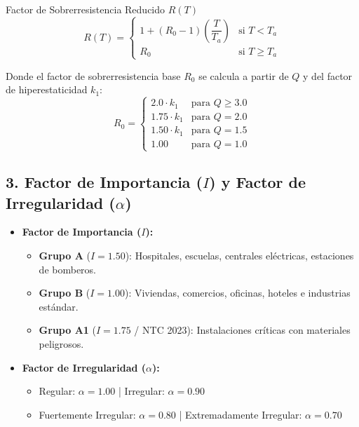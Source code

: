 \documentclass[11pt,a4paper]{article}
\begin{document}
\begin{formulabox}{Factor de Sobrerresistencia Reducido $R(T)$}
$$
R(T) = 
\begin{cases} 
1 + (R_0 - 1) \left(\dfrac{T}{T_a}\right) & \text{si } T < T_a \\[8pt]
R_0 & \text{si } T \ge T_a
\end{cases}
$$
\end{formulabox}

Donde el factor de sobrerresistencia base $R_0$ se calcula a partir de $Q$ y del factor de hiperestaticidad $k_1$:
\begin{equation}
R_0 = 
\begin{cases}
2.0 \cdot k_1 & \text{para } Q \ge 3.0 \\
1.75 \cdot k_1 & \text{para } Q = 2.0 \\
1.50 \cdot k_1 & \text{para } Q = 1.5 \\
1.00 & \text{para } Q = 1.0
\end{cases}
\end{equation}

\subsection{3. Factor de Importancia ($I$) y Factor de Irregularidad ($\alpha$)}
\begin{itemize}[noitemsep]
    \item \textbf{Factor de Importancia ($I$):}
    \begin{itemize}[noitemsep]
        \item \textbf{Grupo A} ($I = 1.50$): Hospitales, escuelas, centrales eléctricas, estaciones de bomberos.
        \item \textbf{Grupo B} ($I = 1.00$): Viviendas, comercios, oficinas, hoteles e industrias estándar.
        \item \textbf{Grupo A1} ($I = 1.75$ / NTC 2023): Instalaciones críticas con materiales peligrosos.
    \end{itemize}
    \item \textbf{Factor de Irregularidad ($\alpha$):}
    \begin{itemize}[noitemsep]
        \item Regular: $\alpha = 1.00$ \quad | \quad Irregular: $\alpha = 0.90$
        \item Fuertemente Irregular: $\alpha = 0.80$ \quad | \quad Extremadamente Irregular: $\alpha = 0.70$
    \end{itemize}
\end{itemize}
\end{document}
